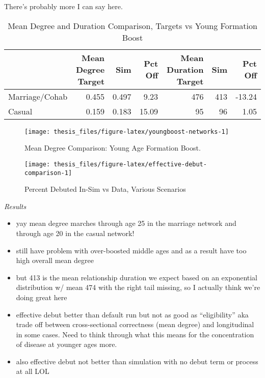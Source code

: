 \documentclass [11pt, proquest] {uwthesis}[2015/03/03]
\providecommand{\tightlist}{%
  \setlength{\itemsep}{0pt}\setlength{\parskip}{0pt}}
\begin{document}
There's probably more I can say here.
\begin{table}

\caption{\label{tab:youngboost-tab}Mean Degree and Duration Comparison, Targets vs Young Formation Boost}
\centering
\begin{tabular}[t]{lrrrrrr}
\toprule
  & Mean Degree Target & Sim & Pct Off & Mean Duration Target & Sim & Pct Off\\
\midrule
Marriage/Cohab & 0.455 & 0.497 & 9.23 & 476 & 413 & -13.24\\
Casual & 0.159 & 0.183 & 15.09 & 95 & 96 & 1.05\\
\bottomrule
\end{tabular}
\end{table}
\begin{figure}

{\centering \texttt{[image: thesis\_files/figure-latex/youngboost-networks-1]} 

}

\caption{Mean Degree Comparison: Young Age Formation Boost.}\label{fig:youngboost-networks}
\end{figure}
\begin{figure}

{\centering \texttt{[image: thesis\_files/figure-latex/effective-debut-comparison-1]} 

}

\caption{Percent Debuted In-Sim vs Data, Various Scenarios}\label{fig:effective-debut-comparison}
\end{figure}
\emph{Results}
\begin{itemize}
\tightlist
\item
  yay mean degree marches through age 25 in the marriage network and
  through age 20 in the casual network!\\
\item
  still have problem with over-boosted middle ages and as a result have
  too high overall mean degree\\
\item
  but 413 is the mean relationship duration we expect based on an
  exponential distribution w/ mean 474 with the right tail missing, so I
  actually think we're doing great here\\
\item
  effective debut better than default run but not as good as
  ``eligibility'' aka trade off between cross-sectional correctness
  (mean degree) and longitudinal in some cases. Need to think through
  what this means for the concentration of disease at younger ages
  more.\\
\item
  also effective debut not better than simulation with no debut term or
  process at all LOL
\end{itemize}
\end{document}

